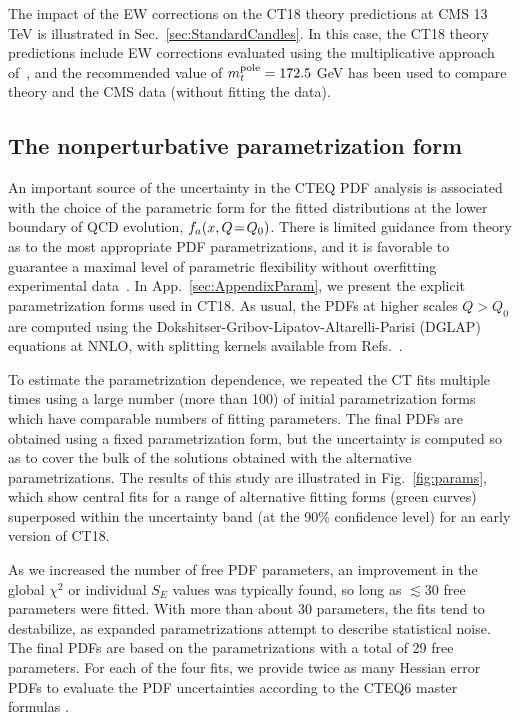The impact of the EW corrections on the CT18 theory predictions at CMS 13 TeV is illustrated in Sec.~\ref{sec:StandardCandles}. In this case, the CT18 theory predictions include EW corrections evaluated using the multiplicative approach of~\cite{Czakon:2017wor}, and the recommended value of $m_t^{\rm pole}=172.5$ GeV has been used to compare theory and the CMS data (without fitting the data).

\subsection{The nonperturbative parametrization form} 
\label{sec:Paramstudies}

An important source of the uncertainty in the CTEQ PDF analysis is associated with the choice of the parametric form for the fitted distributions at the lower boundary of QCD evolution, $f_a(x,Q\! =\! Q_0)$. There is limited guidance
from theory as to the most appropriate PDF parametrizations, and it is
favorable to guarantee a maximal level of parametric flexibility without
overfitting experimental data~\cite{Kovarik:2019xvh}. In App.~\ref{sec:AppendixParam}, we present the explicit parametrization forms used in CT18. As usual, the PDFs at higher scales $Q>Q_0$ are computed
using the Dokshitser-Gribov-Lipatov-Altarelli-Parisi (DGLAP) equations at NNLO, with splitting kernels available from Refs.~\cite{Moch:2004pa,Vogt:2004mw,Ablinger:2014nga,Ablinger:2017tan}.
%
%

To estimate the parametrization dependence, we repeated the CT fits multiple times using a large number (more than 100) of initial parametrization forms which have comparable numbers of fitting
parameters. The final PDFs are obtained using a fixed parametrization form, but the uncertainty is computed so as to cover the bulk of the solutions obtained with the alternative parametrizations.  The results of this study are illustrated in Fig.~\ref{fig:params},
which show central fits for a range of alternative fitting forms (green curves) superposed within
the uncertainty band (at the 90\% confidence level) for an early version of CT18. 
%
%

As we increased the number of free PDF parameters, an improvement in the global $\chi^2$ or individual $S_E$ values was typically found, so long as $\lesssim\! 30$ free parameters were fitted. With more than about 30 parameters, the fits tend
to destabilize, as expanded parametrizations attempt to describe statistical noise.
The final PDFs are based on the parametrizations with a total of 29 free parameters. For each of the four fits, we provide twice as many Hessian error PDFs to evaluate the PDF uncertainties according to the CTEQ6 master formulas \cite{Pumplin:2002vw}.

